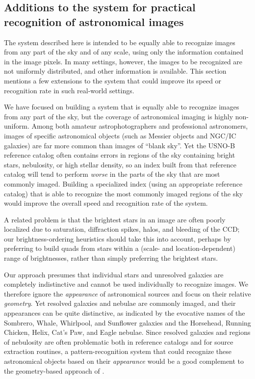 \subsection{Additions to the \an system for practical recognition of astronomical images}


The \an system described here is intended to be equally able to
recognize images from any part of the sky and of any scale, using only
the information contained in the image pixels.  In many settings,
however, the images to be recognized are not uniformly distributed,
and other information is available.  This section mentions a few
extensions to the system that could improve its speed or recognition
rate in such real-world settings.


We have focused on building a system that is equally able to recognize
images from any part of the sky, but the coverage of astronomical
imaging is highly non-uniform.  Among both amateur astrophotographers
and professional astronomers, images of specific astronomical objects
(such as Messier objects and NGC/IC galaxies) are far more common than
images of ``blank sky''.  Yet the USNO-B reference catalog often
contains errors in regions of the sky containing bright stars,
nebulosity, or high stellar density, so an index built from that
reference catalog will tend to perform \emph{worse} in the parts of
the sky that are most commonly imaged.  Building a specialized index
(using an appropriate reference catalog) that is able to recognize the
most commonly imaged regions of the sky would improve the overall
speed and recognition rate of the system.


A related problem is that the brightest stars in an image are often
poorly localized due to saturation, diffraction spikes, halos, and
bleeding of the CCD; our brightness-ordering heuristics should take
this into account, perhaps by preferring to build quads from stars
within a (scale- and location-dependent) range of brightnesses, rather
than simply preferring the brightest stars.


Our approach presumes that individual stars and unresolved galaxies
are completely indistinctive and cannot be used individually to recognize
images.  We therefore ignore the \emph{appearance} of astronomical
sources and focus on their relative \emph{geometry}.  Yet resolved
galaxies and nebulae are commonly imaged, and their appearances can be
quite distinctive, as indicated by the evocative names of the
Sombrero, Whale, Whirlpool, and Sunflower galaxies and the Horsehead,
Running Chicken, Helix, Cat's Paw, and Eagle nebulae.  Since resolved
galaxies and regions of nebulosity are often problematic both in
reference catalogs and for source extraction routines, a
pattern-recognition system that could recognize these astronomical
objects based on their \emph{appearance} would be a good complement to
the geometry-based approach of \an.


